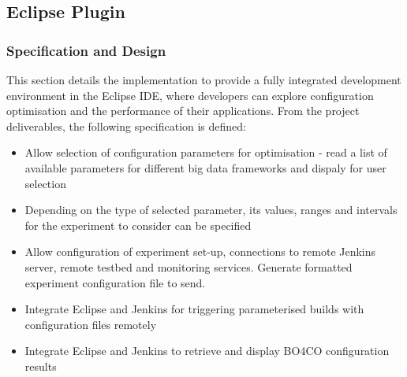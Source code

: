 \newpage
\subsection{Eclipse Plugin}
\subsubsection{Specification and Design}
This section details the implementation to provide a fully integrated development environment in the Eclipse IDE, where developers can explore configuration optimisation and the performance of their applications. From the project deliverables, the following specification is defined:
\begin{itemize}
\item Allow selection of configuration parameters for optimisation - read a list of available parameters for different big data frameworks and dispaly for user selection
\item Depending on the type of selected parameter, its values, ranges and intervals for the experiment to consider can be specified
\item Allow configuration of experiment set-up, connections to remote Jenkins server, remote testbed and monitoring services. Generate formatted experiment configuration file to send.
\item Integrate Eclipse and Jenkins for triggering parameterised builds with configuration files remotely
\item Integrate Eclipse and Jenkins to retrieve and display BO4CO configuration results
\end{itemize}

